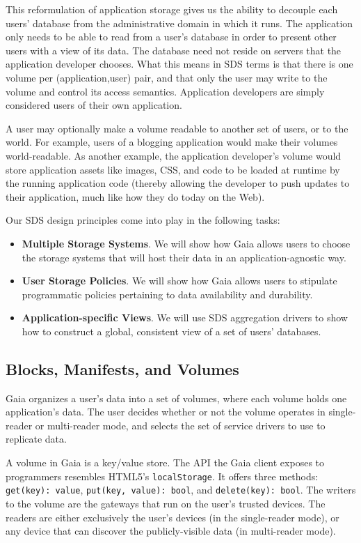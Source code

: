This reformulation of application storage gives us the ability to decouple each
users' database from the administrative domain in which it runs.  The
application only needs to be able to read from a user's database in order to
present other users with a view of its data.  The database need not reside on
servers that the application developer chooses.  What this means in SDS terms is
that there is one volume per (application,user) pair, and that only the user may
write to the volume and control its access semantics.  Application developers
are simply considered users of their own application.

A user may optionally make a volume readable to another set of users, or to the
world.  For example, users of a blogging application would make their volumes
world-readable.  As another example, the application developer's volume would
store application assets like images, CSS, and code to be loaded at runtime by
the running application code (thereby allowing the developer to push
updates to their application, much like how they do today on the Web).

Our SDS design principles come into play in the following tasks:

\begin{itemize}
   \item \textbf{Multiple Storage Systems}.  We will show how Gaia allows users
      to choose the storage systems that will host their data in an
      application-agnostic way.
   \item \textbf{User Storage Policies}.  We will show how Gaia allows users to
      stipulate programmatic policies pertaining to data availability and durability.
   \item \textbf{Application-specific Views}.  We will use SDS aggregation
      drivers to show how to construct a
      global, consistent view of a set of users' databases.
\end{itemize}

\subsection{Blocks, Manifests, and Volumes}

Gaia organizes a user's data into a set of volumes, where each volume
holds one application's data.  The user decides whether or not the volume
operates in single-reader or multi-reader mode, and selects the set of
service drivers to use to replicate data.

A volume in Gaia is a key/value store.  The API the Gaia client exposes to
programmers resembles HTML5's \texttt{localStorage}.  It offers three methods:
\texttt{get(key): value}, \texttt{put(key, value): bool}, and
\texttt{delete(key): bool}.  The writers to the volume are the gateways that run
on the user's trusted devices.  The readers are either exclusively the user's
devices (in the single-reader mode), or any device that can discover the
publicly-visible data (in multi-reader mode).


